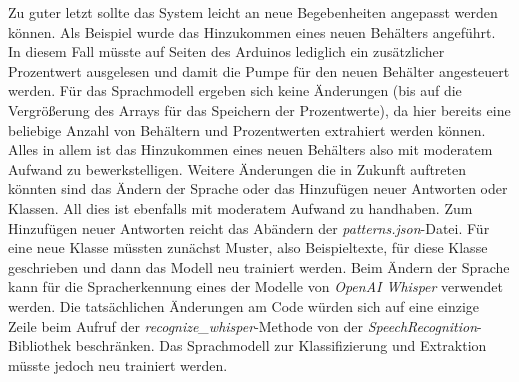 Zu guter letzt sollte das System leicht an neue Begebenheiten angepasst werden können. Als Beispiel wurde das Hinzukommen eines neuen Behälters angeführt. In diesem Fall müsste auf Seiten des Arduinos lediglich ein zusätzlicher Prozentwert ausgelesen und damit die Pumpe für den neuen Behälter angesteuert werden. Für das Sprachmodell ergeben sich keine Änderungen (bis auf die Vergrößerung des Arrays für das Speichern der Prozentwerte), da hier bereits eine beliebige Anzahl von Behältern und Prozentwerten extrahiert werden können. Alles in allem ist das Hinzukommen eines neuen Behälters also mit moderatem Aufwand zu bewerkstelligen. Weitere Änderungen die in Zukunft auftreten könnten sind das Ändern der Sprache oder das Hinzufügen neuer Antworten oder Klassen. All dies ist ebenfalls mit moderatem Aufwand zu handhaben. Zum Hinzufügen neuer Antworten reicht das Abändern der \textit{patterns.json}-Datei. Für eine neue Klasse müssten zunächst Muster, also Beispieltexte, für diese Klasse geschrieben und dann das Modell neu trainiert werden. Beim Ändern der Sprache kann für die Spracherkennung eines der Modelle von \textit{OpenAI Whisper} verwendet werden. Die tatsächlichen Änderungen am Code würden sich auf eine einzige Zeile beim Aufruf der \textit{recognize\_whisper}-Methode von der \textit{SpeechRecognition}-Bibliothek beschränken. Das Sprachmodell zur Klassifizierung und Extraktion müsste jedoch neu trainiert werden.
